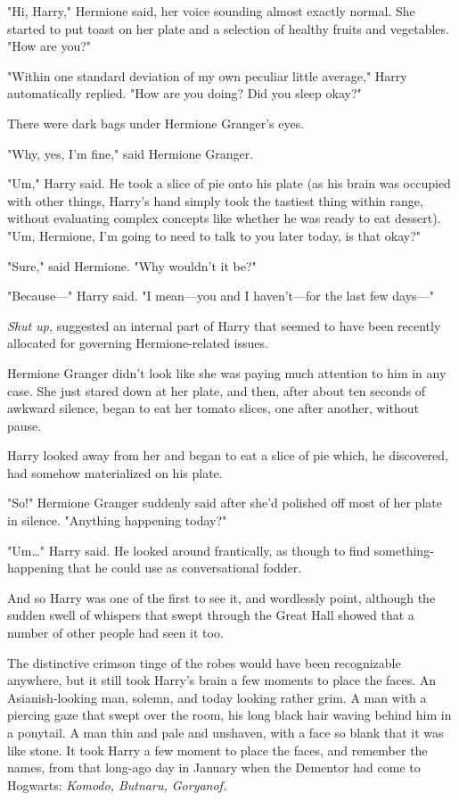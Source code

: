 "Hi, Harry," Hermione said, her voice sounding almost exactly normal. She 
started to put toast on her plate and a selection of healthy fruits and 
vegetables. "How are you?"

"Within one standard deviation of my own peculiar little average," Harry 
automatically replied. "How are you doing? Did you sleep okay?"

There were dark bags under Hermione Granger's eyes.

"Why, yes, I'm fine," said Hermione Granger.

"Um," Harry said. He took a slice of pie onto his plate (as his brain was 
occupied with other things, Harry's hand simply took the tastiest thing within 
range, without evaluating complex concepts like whether he was ready to eat 
dessert). "Um, Hermione, I'm going to need to talk to you later today, is that 
okay?"

"Sure," said Hermione. "Why wouldn't it be?"

"Because---" Harry said. "I mean---you and I haven't---for the last few days---"

\emph{Shut up,} suggested an internal part of Harry that seemed to have been 
recently allocated for governing Hermione-related issues.

Hermione Granger didn't look like she was paying much attention to him in any 
case. She just stared down at her plate, and then, after about ten seconds of 
awkward silence, began to eat her tomato slices, one after another, without 
pause.

Harry looked away from her and began to eat a slice of pie which, he 
discovered, had somehow materialized on his plate.

"So!" Hermione Granger suddenly said after she'd polished off most of her plate 
in silence. "Anything happening today?"

"Um{\ldots}" Harry said. He looked around frantically, as though to find 
something-happening that he could use as conversational fodder.

And so Harry was one of the first to see it, and wordlessly point, although the 
sudden swell of whispers that swept through the Great Hall showed that a number 
of other people had seen it too.

The distinctive crimson tinge of the robes would have been recognizable 
anywhere, but it still took Harry's brain a few moments to place the faces. An 
Asianish-looking man, solemn, and today looking rather grim. A man with a 
piercing gaze that swept over the room, his long black hair waving behind him 
in a ponytail. A man thin and pale and unshaven, with a face so blank that it 
was like stone. It took Harry a few moment to place the faces, and remember the 
names, from that long-ago day in January when the Dementor had come to 
Hogwarts: \emph{Komodo, Butnaru, Goryanof.}

